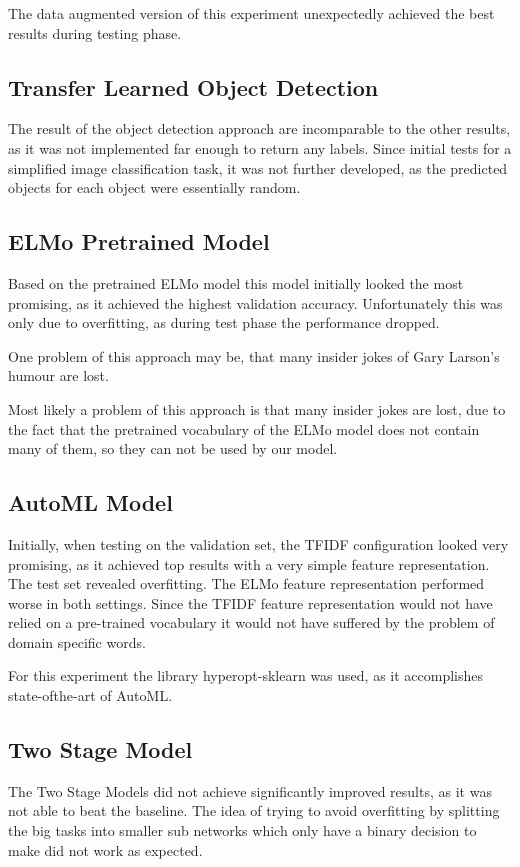 \documentclass[draft,final,oneside]{vutinfth} %
\begin{document}
The data augmented version of this experiment unexpectedly achieved the best results
during testing phase.

\subsection{Transfer Learned Object Detection}

The result of the object detection approach are incomparable to the other results, as it was not implemented far enough to return any labels. Since initial tests for a simplified image classification task, it was not further developed, as the predicted objects for each object were essentially
random.

\subsection{ELMo Pretrained Model}

Based on the pretrained ELMo model this model initially looked the most promising, as it
achieved the highest validation accuracy. Unfortunately this was only due to overfitting,
as during test phase the performance dropped.

One problem of this approach may be, that many insider jokes of Gary Larson's humour are lost.

Most likely a problem of this approach is that many insider jokes are lost, due to the fact
that the pretrained vocabulary of the ELMo model does not contain many of them, so
they can not be used by our model.

\subsection{AutoML Model}
Initially, when testing on the validation set, the TFIDF configuration looked very promising, as it achieved top results with a very simple feature representation. The test set
revealed overfitting. The ELMo feature representation performed worse in both settings.
Since the TFIDF feature representation would not have relied on a pre-trained vocabulary
it would not have suffered by the problem of domain specific words.

For this experiment the library hyperopt-sklearn was used, as it accomplishes state-ofthe-art of AutoML.

\subsection{Two Stage Model}
The Two Stage Models did not achieve significantly improved results, as it was not able
to beat the baseline. The idea of trying to avoid overfitting by splitting the big tasks into
smaller sub networks which only have a binary decision to make did not work as expected.
\end{document}
